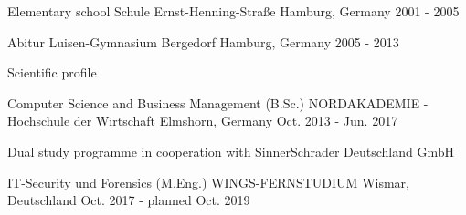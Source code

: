 

\begin{cventries}

  \cventry
    {Elementary school} %
    {Schule Ernst-Henning-Straße} %
    {Hamburg, Germany} %
    {2001 - 2005} %
    {}

  \cventry
    {Abitur} %
    {Luisen-Gymnasium Bergedorf} %
    {Hamburg, Germany} %
    {2005 - 2013} %
    {
      \begin{cvitems} %
        \item {Scientific profile}
      \end{cvitems}
    }

  \cventry
    {Computer Science and Business Management (B.Sc.)} %
    {NORDAKADEMIE - Hochschule der Wirtschaft} %
    {Elmshorn, Germany} %
    {Oct. 2013 - Jun. 2017} %
    {
      \begin{cvitems} %
        \item {Dual study programme in cooperation with SinnerSchrader Deutschland GmbH}
      \end{cvitems}
    }

  \cventry
    {IT-Security und Forensics (M.Eng.)} %
    {WINGS-FERNSTUDIUM} %
    {Wismar, Deutschland} %
    {Oct. 2017 - planned Oct. 2019} %
    {}

\end{cventries}
